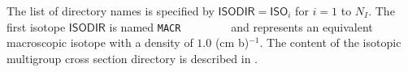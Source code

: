The list of directory names is specified by $\mathsf{ISODIR}=\mathsf{ISO}_{i}$ for $i=1$ to
$N_{I}$. The first isotope $\mathsf{ISODIR}$ is named \verb*|MACR        | and represents an equivalent
macroscopic isotope  with a density of $1.0$ (cm b)$^{-1}$. The content of the isotopic multigroup cross
section directory is described in . 


